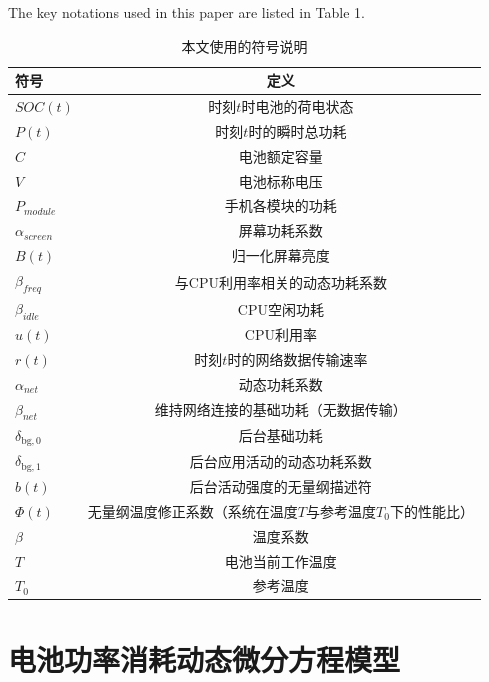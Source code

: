 \documentclass{mcmthesis}  %
\begin{document}
	The key notations used in this paper are listed in Table 1.
	\begin{table}[h!]
		\centering
		\caption{本文使用的符号说明}
		\label{tab:notations}
		\renewcommand{\arraystretch}{1.5} 
		\begin{tabular}{lc}
			\toprule
			\textbf{符号} & \textbf{定义} \\
			\midrule
			\rowcolor{LightGreen}
			$SOC(t)$ & 时刻$t$时电池的荷电状态 \\
			$P(t)$ & 时刻$t$时的瞬时总功耗 \\
			\rowcolor{LightGreen}
			$C$ & 电池额定容量 \\
			$V$ & 电池标称电压 \\
			\rowcolor{LightGreen}
			$P_{module}$ & 手机各模块的功耗 \\
			$\alpha_{screen}$ & 屏幕功耗系数 \\
			\rowcolor{LightGreen}
			$B(t)$ & 归一化屏幕亮度 \\
			$\beta_{freq}$ & 与CPU利用率相关的动态功耗系数 \\
			\rowcolor{LightGreen}
			$\beta_{idle}$ & CPU空闲功耗 \\
			$u(t)$ & CPU利用率 \\
			\rowcolor{LightGreen}
			$r(t)$ & 时刻$t$时的网络数据传输速率 \\
			$\alpha_{net}$ & 动态功耗系数 \\
			\rowcolor{LightGreen}
			$\beta_{net}$ & 维持网络连接的基础功耗（无数据传输） \\
			$\delta_{\text{bg},0}$ & 后台基础功耗 \\
			\rowcolor{LightGreen}
			$\delta_{\text{bg},1}$ & 后台应用活动的动态功耗系数 \\
			$b(t)$ & 后台活动强度的无量纲描述符 \\
			\rowcolor{LightGreen}
			$\Phi(t)$ & 无量纲温度修正系数（系统在温度$T$与参考温度$T_0$下的性能比） \\
			$\beta$ & 温度系数 \\
			\rowcolor{LightGreen}
			$T$ & 电池当前工作温度 \\
			$T_0$ & 参考温度 \\
			\bottomrule
		\end{tabular}
	\end{table}
	
	\newpage
	
	\section{电池功率消耗动态微分方程模型} 
	
\end{document}
